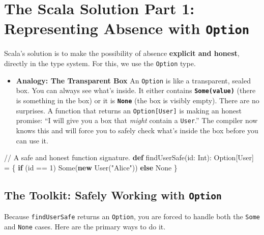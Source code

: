 \documentclass[
  letterpaper,
  DIV=11,
  numbers=noendperiod]{scrreprt}
\newenvironment{Shaded}{\begin{snugshade}}{\end{snugshade}}
\newcommand{\BuiltInTok}[1]{\textcolor[rgb]{0.00,0.23,0.31}{#1}}
\newcommand{\CommentTok}[1]{\textcolor[rgb]{0.37,0.37,0.37}{#1}}
\newcommand{\ControlFlowTok}[1]{\textcolor[rgb]{0.00,0.23,0.31}{\textbf{#1}}}
\newcommand{\DecValTok}[1]{\textcolor[rgb]{0.68,0.00,0.00}{#1}}
\newcommand{\ExtensionTok}[1]{\textcolor[rgb]{0.00,0.23,0.31}{#1}}
\newcommand{\FunctionTok}[1]{\textcolor[rgb]{0.28,0.35,0.67}{#1}}
\newcommand{\KeywordTok}[1]{\textcolor[rgb]{0.00,0.23,0.31}{\textbf{#1}}}
\newcommand{\NormalTok}[1]{\textcolor[rgb]{0.00,0.23,0.31}{#1}}
\newcommand{\OperatorTok}[1]{\textcolor[rgb]{0.37,0.37,0.37}{#1}}
\newcommand{\StringTok}[1]{\textcolor[rgb]{0.13,0.47,0.30}{#1}}
\providecommand{\tightlist}{%
  \setlength{\itemsep}{0pt}\setlength{\parskip}{0pt}}
\begin{document}
\section{\texorpdfstring{The Scala Solution Part 1: Representing Absence
with
\texttt{Option}}{The Scala Solution Part 1: Representing Absence with Option}}\label{the-scala-solution-part-1-representing-absence-with-option}

Scala's solution is to make the possibility of absence \textbf{explicit
and honest}, directly in the type system. For this, we use the
\texttt{Option} type.

\begin{itemize}
\tightlist
\item
  \textbf{Analogy: The Transparent Box} An \texttt{Option} is like a
  transparent, sealed box. You can always see what's inside. It either
  contains \textbf{\texttt{Some(value)}} (there is something in the box)
  or it is \textbf{\texttt{None}} (the box is visibly empty). There are
  no surprises. A function that returns an \texttt{Option{[}User{]}} is
  making an honest promise: ``I will give you a box that \emph{might}
  contain a \texttt{User}.'' The compiler now knows this and will force
  you to safely check what's inside the box before you can use it.
\end{itemize}

\begin{Shaded}
\begin{Highlighting}[]
\CommentTok{// A safe and honest function signature.}
\KeywordTok{def} \FunctionTok{findUserSafe}\OperatorTok{(}\NormalTok{id}\OperatorTok{:} \BuiltInTok{Int}\OperatorTok{):} \ExtensionTok{Option}\OperatorTok{[}\NormalTok{User}\OperatorTok{]} \OperatorTok{=} \OperatorTok{\{}
  \ControlFlowTok{if} \OperatorTok{(}\NormalTok{id }\OperatorTok{==} \DecValTok{1}\OperatorTok{)} \BuiltInTok{Some}\OperatorTok{(}\KeywordTok{new} \FunctionTok{User}\OperatorTok{(}\StringTok{"Alice"}\OperatorTok{))} \ControlFlowTok{else} \BuiltInTok{None}
\OperatorTok{\}}
\end{Highlighting}
\end{Shaded}

\subsection{\texorpdfstring{The Toolkit: Safely Working with
\texttt{Option}}{The Toolkit: Safely Working with Option}}\label{the-toolkit-safely-working-with-option}

Because \texttt{findUserSafe} returns an \texttt{Option}, you are forced
to handle both the \texttt{Some} and \texttt{None} cases. Here are the
primary ways to do it.
\end{document}
